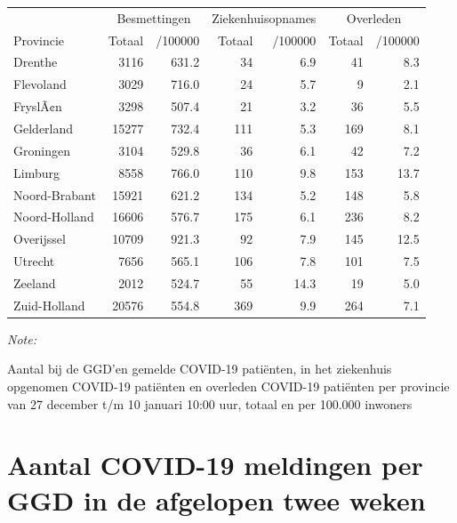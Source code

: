 \documentclass[
  english,
  man,floatsintext]{apa6}
\begin{document}
\begin{table}[H]
\centering
\begin{threeparttable}
\begin{tabular}{lrrrrrr}
\toprule
\multicolumn{1}{c}{ } & \multicolumn{2}{c}{Besmettingen} & \multicolumn{2}{c}{Ziekenhuisopnames} & \multicolumn{2}{c}{Overleden} \\
\cmidrule(l{3pt}r{3pt}){2-3} \cmidrule(l{3pt}r{3pt}){4-5} \cmidrule(l{3pt}r{3pt}){6-7}
Provincie & Totaal & /100000 & Totaal & /100000 & Totaal & /100000\\
\midrule
Drenthe & 3116 & 631.2 & 34 & 6.9 & 41 & 8.3\\
Flevoland & 3029 & 716.0 & 24 & 5.7 & 9 & 2.1\\
FryslÃ¢n & 3298 & 507.4 & 21 & 3.2 & 36 & 5.5\\
Gelderland & 15277 & 732.4 & 111 & 5.3 & 169 & 8.1\\
Groningen & 3104 & 529.8 & 36 & 6.1 & 42 & 7.2\\
Limburg & 8558 & 766.0 & 110 & 9.8 & 153 & 13.7\\
Noord-Brabant & 15921 & 621.2 & 134 & 5.2 & 148 & 5.8\\
Noord-Holland & 16606 & 576.7 & 175 & 6.1 & 236 & 8.2\\
Overijssel & 10709 & 921.3 & 92 & 7.9 & 145 & 12.5\\
Utrecht & 7656 & 565.1 & 106 & 7.8 & 101 & 7.5\\
Zeeland & 2012 & 524.7 & 55 & 14.3 & 19 & 5.0\\
Zuid-Holland & 20576 & 554.8 & 369 & 9.9 & 264 & 7.1\\
\bottomrule
\end{tabular}
\begin{tablenotes}
\item \textit{Note: } 
\item Aantal bij de GGD’en gemelde COVID-19 patiënten, in het ziekenhuis opgenomen COVID-19 patiënten en overleden COVID-19 patiënten per provincie van 27 december t/m 10 januari 10:00 uur, totaal en per 100.000 inwoners
\end{tablenotes}
\end{threeparttable}
\end{table}

\newpage

\hypertarget{aantal-covid-19-meldingen-per-ggd-in-de-afgelopen-twee-weken}{%
\section{Aantal COVID-19 meldingen per GGD in de afgelopen twee weken}\label{aantal-covid-19-meldingen-per-ggd-in-de-afgelopen-twee-weken}}
\end{document}
